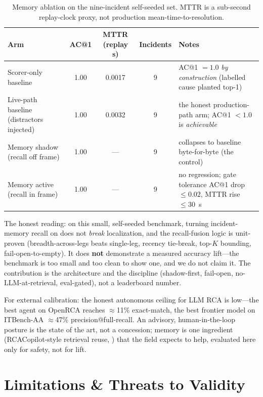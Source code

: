 \documentclass[11pt]{article}
\begin{document}
\begin{table}[ht]
\centering
\caption{Memory ablation on the nine-incident self-seeded set. MTTR is a
sub-second replay-clock proxy, not production mean-time-to-resolution.}
\label{tab:scorecard}
\begin{tabular}{lcccp{4.4cm}}
\toprule
Arm & AC@1 & MTTR (replay s) & Incidents & Notes \\
\midrule
Scorer-only baseline & 1.00 & 0.0017 & 9 & AC@1 $= 1.0$ \emph{by construction} (labelled cause planted top-1) \\
Live-path baseline (distractors injected) & 1.00 & 0.0032 & 9 & the honest production-path arm; AC@1 $< 1.0$ is \emph{achievable} \\
Memory shadow (recall off frame) & 1.00 & --- & 9 & collapses to baseline byte-for-byte (the control) \\
Memory active (recall in frame) & 1.00 & --- & 9 & no regression; gate tolerance AC@1 drop $\le 0.02$, MTTR rise $\le 30$~s \\
\bottomrule
\end{tabular}
\end{table}

The honest reading: on this small, self-seeded benchmark, turning incident-memory
recall on does not \emph{break} localization, and the recall-fusion logic is
unit-proven (breadth-across-legs beats single-leg, recency tie-break, top-$K$
bounding, fail-open-to-empty). It does \textbf{not} demonstrate a measured
accuracy lift---the benchmark is too small and too clean to show one, and we do
not claim it. The contribution is the architecture and the discipline
(shadow-first, fail-open, no-LLM-at-retrieval, eval-gated), not a leaderboard
number.

For external calibration: the honest autonomous ceiling for LLM RCA is low---the
best agent on OpenRCA \citep{xu2025openrca} reaches $\approx$11\% exact-match, the
best frontier model on ITBench-AA \citep{aa2026itbenchaa} $\approx$47\%
precision@full-recall. An advisory, human-in-the-loop posture is the state of the
art, not a concession; memory is one ingredient (RCACopilot-style retrieval reuse,
\citealp{chen2024rcacopilot}) that the field expects to help, evaluated here only
for safety, not for lift.

\section{Limitations \& Threats to Validity}
\label{sec:limitations}
\end{document}
